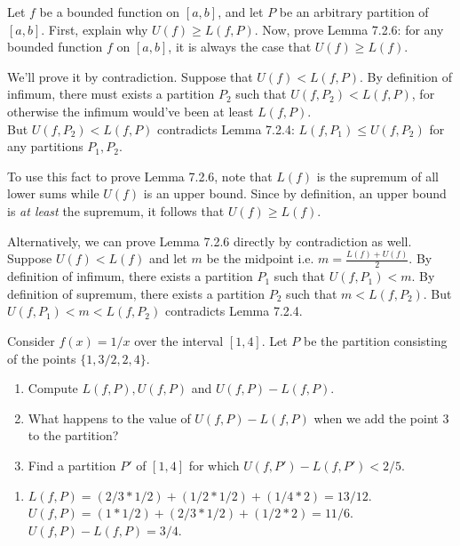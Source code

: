 \documentclass{oxmathproblems}
\begin{document}
\begin{questions}

\miquestion Let $f$ be a bounded function on $[a, b]$, and let $P$ be an arbitrary partition of $[a, b]$. First, explain why
$U(f) \geq L(f, P)$. Now, prove Lemma 7.2.6: for any bounded function $f$ on $[a, b]$, it is always the case that $U(f) \geq L(f)$.

\begin{solution}
  We'll prove it by contradiction. Suppose that $U(f) < L(f, P)$. By definition of infimum, there must exists a partition $P_{2}$ such that
  $U(f, P_{2}) < L(f, P)$, for otherwise the infimum would've been at least $L(f, P)$.\\
  But $U(f, P_{2}) < L(f, P)$ contradicts Lemma 7.2.4: $L(f, P_{1}) \leq U(f, P_{2})$ for any partitions $P_{1}, P_{2}$.

  To use this fact to prove Lemma 7.2.6, note that $L(f)$ is the supremum of all lower sums while $U(f)$ is an upper bound. Since by definition,
  an upper bound is \textit{at least} the supremum, it follows that $U(f) \geq L(f)$.

  Alternatively, we can prove Lemma 7.2.6 directly by contradiction as well. Suppose $U(f) < L(f)$ and let $m$ be the midpoint i.e. $m=\frac{L(f)+U(f)}{2}$.
  By definition of infimum, there exists a partition $P_{1}$ such that $U(f, P_{1}) < m$. By definition of supremum, there exists a
  partition $P_{2}$ such that $m < L(f, P_{2})$. But $U(f, P_{1}) < m < L(f, P_{2})$ contradicts Lemma 7.2.4.
\end{solution}

\miquestion Consider $f(x)=1/x$ over the interval $[1, 4]$. Let $P$ be the partition consisting of the points $\{1, 3/2, 2, 4\}$.
\begin{enumerate}[label=(\alph*)]
  \item Compute $L(f, P), U(f, P)$ and $U(f, P) - L(f, P)$.
  \item What happens to the value of $U(f, P)-L(f, P)$ when we add the point 3 to the partition?
  \item Find a partition $P'$ of $[1, 4]$ for which $U(f, P')-L(f, P') < 2/5$.
\end{enumerate}

\begin{solution}
  \begin{enumerate}[label=(\alph*)]
    \item $L(f, P) = (2/3 * 1/2) + (1/2 * 1/2) + (1/4 * 2) = 13/12$.\\
    $U(f, P) = (1 * 1/2)+ (2/3 * 1/2) + (1/2 * 2) = 11/6$.\\
    $U(f, P)-L(f, P)= 3/4$.


\end{enumerate}
\end{solution}
\end{questions}
\end{document}
